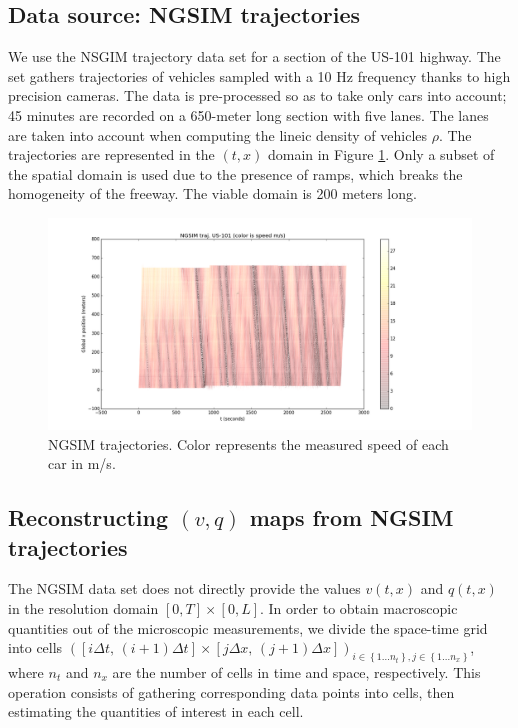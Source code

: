 \documentclass[preprint]{elsarticle}
\begin{document}
\subsection{Data source: NGSIM trajectories}

We use the NSGIM trajectory data set for a section of the US-101 highway. The set gathers trajectories of vehicles sampled with a 10 Hz frequency thanks to high precision cameras. The data is pre-processed so as to take only cars into account; 45 minutes are recorded on a 650-meter long section with five lanes. The lanes are taken into account when computing the lineic density of vehicles $\rho$.
The trajectories are represented in the $(t,x)$ domain
in Figure \ref{fig:NGSIM-trajectories}.
Only a subset of the spatial domain is used due to the presence of ramps, which breaks the homogeneity of the freeway. The viable domain is 200 meters long.

\begin{figure}[H]
\centering
\includegraphics[width=12cm]{Numerics/US-101_all_traj_low_res}
\protect\caption{NGSIM trajectories. Color represents the measured speed of each
car in m/s.}
\label{fig:NGSIM-trajectories}
\end{figure}



\subsection{Reconstructing $(v,q)$ maps from NGSIM trajectories}

The NGSIM data set does not directly provide the values $v(t,x)$
and $q(t,x)$ in the resolution domain $\left[0,T\right]\times\left[0,L\right]$.
In order to obtain macroscopic quantities out of the microscopic measurements,
we divide the space-time grid
into cells $\left(\left[i\Delta t,\, \left(i+1\right)\Delta t\right]\times\left[j\Delta x, \, (j+1)\Delta x\right]\right)_{i\in\left\{ 1\ldots n_{t}\right\} ,j\in\left\{ 1\ldots n_{x}\right\} }$, where $n_t$ and $n_x$ are the number of cells in time and space, respectively. This operation consists of gathering corresponding data points into cells, then estimating the quantities of interest in each cell. 
\end{document}

